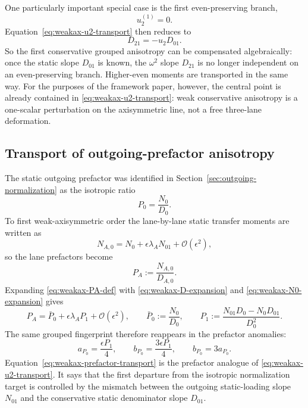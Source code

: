 \documentclass[11pt]{article}
\theoremstyle{definition}
\newcommand{\cO}{\mathcal O}
\begin{document}
One particularly important special case is the first even-preserving branch,
\begin{equation}
 u_2^{(1)}=0.
 \label{eq:weakax-even-preserving}
\end{equation}
Equation~\eqref{eq:weakax-u2-transport} then reduces to
\begin{equation}
 D_{21}=-u_2D_{01}.
 \label{eq:weakax-even-preserving-condition}
\end{equation}
So the first conservative grouped anisotropy can be compensated algebraically: once the static slope $D_{01}$ is known, the $\omega^2$ slope $D_{21}$ is no longer independent on an even-preserving branch. Higher-even moments are transported in the same way. For the purposes of the framework paper, however, the central point is already contained in \eqref{eq:weakax-u2-transport}: weak conservative anisotropy is a one-scalar perturbation on the axisymmetric line, not a free three-lane deformation.

\subsection{Transport of outgoing-prefactor anisotropy}

The static outgoing prefactor was identified in Section~\ref{sec:outgoing-normalization} as the isotropic ratio
\[
P_0=\frac{N_0}{D_0}.
\]
To first weak-axisymmetric order the lane-by-lane static transfer moments are written as
\begin{equation}
 N_{A,0}=N_0+\epsilon\lambda_A N_{01}+\cO(\epsilon^2),
 \label{eq:weakax-N0-expansion}
\end{equation}
so the lane prefactors become
\begin{equation}
 P_A:=\frac{N_{A,0}}{D_{A,0}}.
 \label{eq:weakax-PA-def}
\end{equation}
Expanding \eqref{eq:weakax-PA-def} with \eqref{eq:weakax-D-expansion} and \eqref{eq:weakax-N0-expansion} gives
\begin{equation}
 P_A
 =
 \bar P_0+\epsilon\lambda_A P_1+\cO(\epsilon^2),
 \qquad
 \bar P_0:=\frac{N_0}{D_0},
 \qquad
 P_1:=\frac{N_{01}D_0-N_0D_{01}}{D_0^2}.
 \label{eq:weakax-prefactor-transport}
\end{equation}
The same grouped fingerprint therefore reappears in the prefactor anomalies:
\begin{equation}
 a_{P_0}=\frac{\epsilon P_1}{4},
 \qquad
 b_{P_0}=\frac{3\epsilon P_1}{4},
 \qquad
 b_{P_0}=3a_{P_0}.
 \label{eq:weakax-prefactor-anomalies}
\end{equation}
Equation~\eqref{eq:weakax-prefactor-transport} is the prefactor analogue of \eqref{eq:weakax-u2-transport}. It says that the first departure from the isotropic normalization target is controlled by the mismatch between the outgoing static-loading slope $N_{01}$ and the conservative static denominator slope $D_{01}$.
\end{document}
